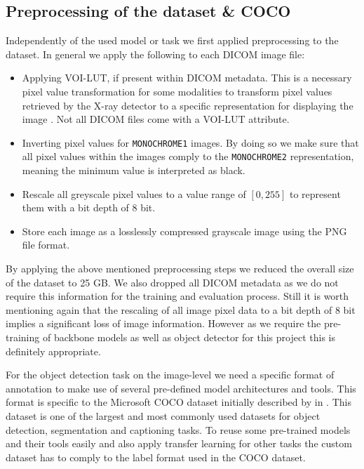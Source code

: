 \subsection*{Preprocessing of the dataset \& COCO}
Independently of the used model or task we first applied preprocessing to the dataset. In general we apply the following to each DICOM image file:
\begin{itemize}
	\item Applying VOI-LUT, if present within DICOM metadata. This is a necessary pixel value transformation for some modalities to transform pixel values retrieved by the X-ray detector to a specific representation for displaying the image \autocite{dicom2018}. Not all DICOM files come with a VOI-LUT attribute.
	\item Inverting pixel values for \texttt{MONOCHROME1} images. By doing so we make sure that all pixel values within the images comply to the \texttt{MONOCHROME2} representation, meaning the minimum value is interpreted as black.
	\item Rescale all greyscale pixel values to a value range of $[0,255]$ to represent them with a bit depth of 8 bit.
	\item Store each image as a losslessly compressed grayscale image using the \ac{PNG} file format.
\end{itemize}

By applying the above mentioned preprocessing steps we reduced the overall size of the dataset to 25 GB. We also dropped all DICOM metadata as we do not require this information for the training and evaluation process. Still it is worth mentioning again that the rescaling of all image pixel data to a bit depth of 8 bit implies a significant loss of image information. However as we require the pre-training of backbone models as well as object detector for this project this is definitely appropriate.

For the object detection task on the image-level we need a specific format of annotation to make use of several pre-defined model architectures and tools. This format is specific to the Microsoft \ac{COCO} dataset initially described by \citeauthor{lin_microsoft_2015} in \citeyear{lin_microsoft_2015}. This dataset is one of the largest and most commonly used datasets for object detection, segmentation and captioning tasks. To reuse some pre-trained models and their tools easily and also apply transfer learning for other tasks the custom dataset has to comply to the label format used in the \ac{COCO} dataset.


